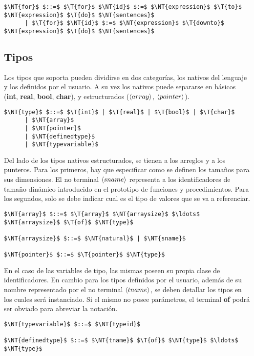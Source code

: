\begin{lstlisting}[style = syntax]
$\NT{for}$ $::=$ $\T{for}$ $\NT{id}$ $:=$ $\NT{expression}$ $\T{to}$ $\NT{expression}$ $\T{do}$ $\NT{sentences}$
      | $\T{for}$ $\NT{id}$ $:=$ $\NT{expression}$ $\T{downto}$ $\NT{expression}$ $\T{do}$ $\NT{sentences}$
\end{lstlisting}

\subsection{Tipos}

Los tipos que soporta \Lenguaje{} pueden dividirse en dos categorías, los nativos del lenguaje y los definidos por el usuario.
A su vez los nativos puede separarse en básicos (\textbf{int}, \textbf{real}, \textbf{bool}, \textbf{char}), y estructurados ($\langle array \rangle$, $\langle pointer \rangle$).

\begin{lstlisting}[style = syntax]
$\NT{type}$ $::=$ $\T{int}$ | $\T{real}$ | $\T{bool}$ | $\T{char}$
      | $\NT{array}$
      | $\NT{pointer}$
      | $\NT{definedtype}$
      | $\NT{typevariable}$
\end{lstlisting}

Del lado de los tipos nativos estructurados, se tienen a los arreglos y a los punteros.
Para los primeros, hay que especificar como se definen los tamaños para sus dimensiones.
El no terminal $\langle sname \rangle$ representa a los identificadores de tamaño dinámico introducido en el prototipo de funciones y procedimientos.
Para los segundos, solo se debe indicar cual es el tipo de valores que se va a referenciar.

\begin{lstlisting}[style = syntax]
$\NT{array}$ $::=$ $\T{array}$ $\NT{arraysize}$ $\ldots$ $\NT{arraysize}$ $\T{of}$ $\NT{type}$

$\NT{arraysize}$ $::=$ $\NT{natural}$ | $\NT{sname}$

$\NT{pointer}$ $::=$ $\T{pointer}$ $\NT{type}$
\end{lstlisting}

En el caso de las variables de tipo, las mismas poseen su propia clase de identificadores.
En cambio para los tipos definidos por el usuario, además de su nombre representado por el no terminal $\langle tname \rangle$, se deben detallar los tipos en los cuales será instanciado.
Si el mismo no posee parámetros, el terminal \textbf{of} podrá ser obviado para abreviar la notación.

\begin{lstlisting}[style = syntax]
$\NT{typevariable}$ $::=$ $\NT{typeid}$

$\NT{definedtype}$ $::=$ $\NT{tname}$ $\T{of}$ $\NT{type}$ $\ldots$ $\NT{type}$
\end{lstlisting}

